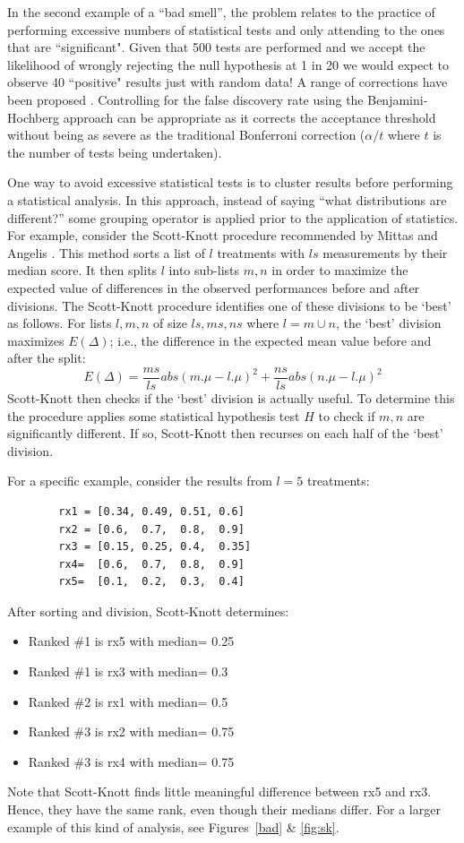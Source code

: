 \documentclass[10pt]{elsarticle}
\newcommand{\bi}{\begin{itemize}}
\newcommand{\ei}{\end{itemize}}
\begin{document}
In the second example of a ``bad smell'', the problem relates to the practice of performing excessive numbers of statistical tests and only attending to the ones that are ``significant".  Given that 500 tests are performed and we accept the likelihood of wrongly rejecting the null hypothesis at 1 in 20 we would expect to observe 40 ``positive" results just with random data!  A range of corrections have been proposed \cite{Bend01}.  Controlling for the false discovery rate using the Benjamini-Hochberg approach \cite{Benj01} can be appropriate as it corrects the acceptance threshold without being as severe as the traditional Bonferroni correction ($\alpha / t$ where $t$ is the number of tests being undertaken).

One way to avoid excessive statistical tests is to cluster results before performing a statistical analysis. In this approach, instead of saying ``what distributions are different?'' some grouping operator is applied prior to the application of statistics.  For example, consider the   Scott-Knott procedure recommended by Mittas and Angelis \cite{mittas2013ranking}.  This method sorts a list of $l$ treatments with $\mathit{ls}$ measurements by their median score. It then splits $l$ into sub-lists $m,n$ in order to maximize the expected value of differences in the observed performances before and after divisions.  The Scott-Knott procedure identifies one of these divisions to be `best' as follows.  For lists $l,m,n$ of size $\mathit{ls},\mathit{ms},\mathit{ns}$ where $l=m\cup n$, the `best' division maximizes $E(\Delta)$; i.e., the difference in the expected mean value before and after the split: 
 \[E(\Delta)=\frac{ms}{ls}abs(m.\mu - l.\mu)^2 + \frac{ns}{ls}abs(n.\mu - l.\mu)^2\]
Scott-Knott then checks if the `best' division is actually useful. To determine this the procedure applies some statistical hypothesis test $H$ to check if $m, n$ are significantly different. If so, Scott-Knott then recurses on each half of the `best' division.
 
For a specific example, consider the results from $l=5$ treatments:

{\small 
\begin{verbatim}
        rx1 = [0.34, 0.49, 0.51, 0.6]
        rx2 = [0.6,  0.7,  0.8,  0.9]
        rx3 = [0.15, 0.25, 0.4,  0.35]
        rx4=  [0.6,  0.7,  0.8,  0.9]
        rx5=  [0.1,  0.2,  0.3,  0.4]
\end{verbatim}
}

\noindent
After sorting and division, Scott-Knott determines:
\bi
\item Ranked \#1 is rx5 with median= 0.25
\item Ranked \#1 is rx3 with median= 0.3
\item Ranked \#2 is rx1 with median= 0.5
\item Ranked \#3 is rx2 with median= 0.75
\item Ranked \#3 is rx4 with median= 0.75
\ei
Note that Scott-Knott finds little meaningful difference between rx5 and rx3. Hence, they have the same rank, even though their medians differ.  For a larger example of this kind of analysis, see Figures~\ref{bad} \& \ref{fig:sk}.
\end{document}
